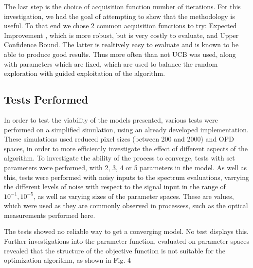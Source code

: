 \documentclass[12pt]{article}
\begin{document}
    The last step is the choice of acquisition function number of iterations.
    For this investigation, we had the goal of attempting to show that the methodology 
    is useful. To that end we chose 2 common acquisition functions to try: Expected Improvement 
    \cite{bo}, which is more robust, but is very costly to evaluate, and Upper Confidence Bound.
    The latter is realtively easy to evaluate and is known to be able to produce good results.
    Thus more often than not UCB was used, along with parameters which are fixed, 
    which are used to balance the random exploration with guided exploitation of the
    algorithm.

    \subsection{Tests Performed}
    In order to test the viability of the models presented, various tests were 
    performed on a simplified simulation, using an already developed implementation. \cite{bo_impl} \cite{scikit}
    These simulations used reduced pixel sizes (between 200 and 2000) and OPD spaces, in order to more 
    efficiently investigate the effect of different aspects of the algorithm. To investigate the ability of the
    process to converge, tests with set parameters were performed, with 2, 3, 4 or 5
    parameters in the model. As well as this, tests were performed with noisy inputs to
    the spectrum evaluations, varrying the different levels of noise with respect to the
    signal input in the range of $10^{-1}, 10^{-5}$, as well as varying sizes of 
    the parameter spaces. These are values, which were used as they are commonly observed 
    in processess, such as the optical measurements performed here.

    The tests showed no reliable way to get a converging model. No test displays this.
    Further investigations into the parameter function, evaluated on parameter spaces
    revealed that the structure of the objective function is not suitable for the 
    optimization algorithm, as shown in Fig. 4
\end{document}
